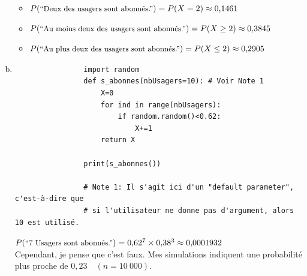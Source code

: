 \documentclass[12pt, a4paper]{article}
\begin{document}
\begin{Exercise}[number={69}]
\begin{enumerate}[a)]
        \begin{itemize}
                \item $P(\text{\small{``Deux des usagers sont abonnés.''}})=P(X=2)\approx0{,}1461$
                \item $P(\text{\small{``Au moins deux des usagers sont abonnés.''}})=P(X\geq2)\approx0{,}3845$
                \item $P(\text{\small{``Au plus deux des usagers sont abonnés.''}})=P(X\leq2)\approx0{,}2905$
              \end{itemize} \break
        \item \begin{verbatim}
                import random
                def s_abonnes(nbUsagers=10): # Voir Note 1
                    X=0
                    for ind in range(nbUsagers):
                        if random.random()<0.62:
                            X+=1
                    return X

                print(s_abonnes())

                # Note 1: Il s'agit ici d'un "default parameter", c'est-à-dire que
                # si l'utilisateur ne donne pas d'argument, alors 10 est utilisé.
              \end{verbatim}
              $P(\text{\small{``7 Usagers sont abonnés.''}})=0{,}62^7\times0{,}38^3\approx0{,}0001932$ \\
              Cependant, je pense que c'est faux. Mes simulations indiquent une probabilité plus proche de $0{,}23 \quad (n=10\ 000)$. %
      \end{enumerate}
    \end{Exercise}
\end{document}
